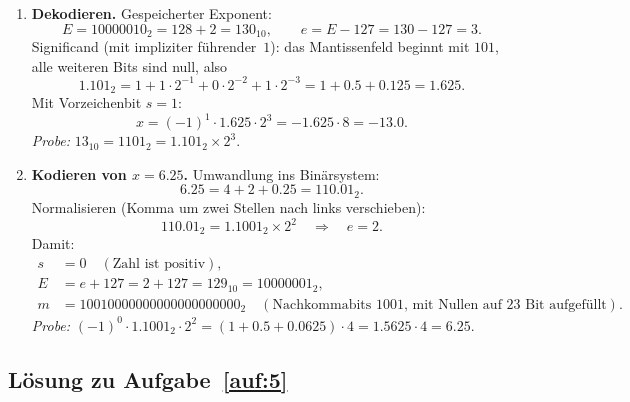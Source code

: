 \documentclass[a4paper,11pt]{scrartcl}
\begin{document}
\begin{enumerate}[label=(\alph*)]
  \item \textbf{Dekodieren.} Gespeicherter Exponent:
  \[
  E = 10000010_2 = 128 + 2 = 130_{10}, \qquad e = E - 127 = 130 - 127 = 3.
  \]
  Significand (mit impliziter führender~$1$): das Mantissenfeld beginnt mit $101$, alle weiteren Bits sind null, also
  \[
  1.101_2 = 1 + 1 \cdot 2^{-1} + 0 \cdot 2^{-2} + 1 \cdot 2^{-3} = 1 + 0.5 + 0.125 = 1.625.
  \]
  Mit Vorzeichenbit $s = 1$:
  \[
  x = (-1)^1 \cdot 1.625 \cdot 2^3 = -1.625 \cdot 8 = \mathbf{-13.0}.
  \]
  \emph{Probe:} $13_{10} = 1101_2 = 1.101_2 \times 2^3$.~\checkmark
  \item \textbf{Kodieren von $x = 6.25$.} Umwandlung ins Binärsystem:
  \[
  6.25 = 4 + 2 + 0.25 = 110.01_2.
  \]
  Normalisieren (Komma um zwei Stellen nach links verschieben):
  \[
  110.01_2 = 1.1001_2 \times 2^2 \quad\Rightarrow\quad e = 2.
  \]
  Damit:
  \begin{align*}
  s &= 0 \quad (\text{Zahl ist positiv}),\\
  E &= e + 127 = 2 + 127 = 129_{10} = 10000001_2,\\
  m &= 10010000000000000000000_2 \quad (\text{Nachkommabits } 1001 \text{, mit Nullen auf 23 Bit aufgefüllt}).
  \end{align*}
  \emph{Probe:} $(-1)^0 \cdot 1.1001_2 \cdot 2^2 = (1 + 0.5 + 0.0625) \cdot 4 = 1.5625 \cdot 4 = 6.25$.~\checkmark
\end{enumerate}

\subsection*{Lösung zu Aufgabe~\ref{auf:5}}
\end{document}

